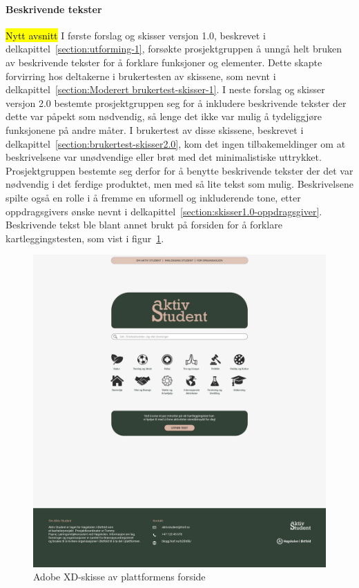 \paragraph{Beskrivende tekster}
\hl{Nytt avsnitt}
I første forslag og skisser versjon 1.0, beskrevet i delkapittel~\ref{section:utforming-1}, forsøkte prosjektgruppen å unngå helt bruken av beskrivende tekster for å forklare funksjoner og elementer. Dette skapte forvirring hos deltakerne i brukertesten av skissene, som nevnt i delkapittel~\ref{section:Moderert brukertest-skisser-1}. I neste forslag og skisser versjon 2.0 bestemte prosjektgruppen seg for å inkludere beskrivende tekster der dette var påpekt som nødvendig, så lenge det ikke var mulig å tydeliggjøre funksjonene på andre måter. I brukertest av disse skissene, beskrevet i delkapittel~\ref{section:brukertest-skisser2.0}, kom det ingen tilbakemeldinger om at beskrivelsene var unødvendige eller brøt med det minimalistiske uttrykket. Prosjektgruppen bestemte seg derfor for å benytte beskrivende tekster der det var nødvendig i det ferdige produktet, men med så lite tekst som mulig. Beskrivelsene spilte også en rolle i å fremme en uformell og inkluderende tone, etter oppdragsgivers ønske nevnt i delkapittel~\ref{section:skisser1.0-oppdragsgiver}. Beskrivende tekst ble blant annet brukt på forsiden for å forklare kartleggingstesten, som vist i figur~\ref{fig:3-1-forside}.

\begin{figure}[H]
\centering
\includegraphics[width=.7\textwidth]{Illustrasjoner/Skisser-pdf/3.0/3-1-forside.pdf}
\caption{Adobe XD-skisse av plattformens forside}
\label{fig:3-1-forside}
\end{figure}

